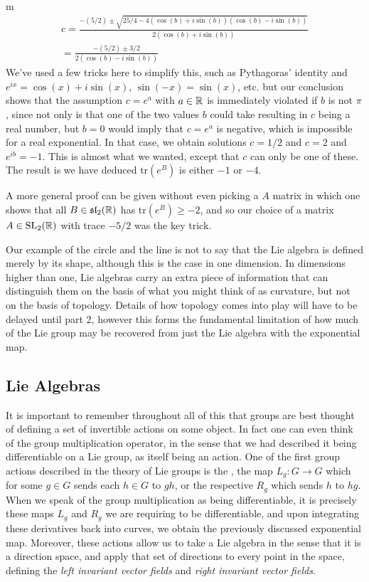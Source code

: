 \documentclass[11pt]{article}
\begin{document}
\begin{my proof}{m}
\begin{gather*}
c = \frac{-(5/2) \pm \sqrt{25/4 - 4(\cos(b) + i\sin(b))(\cos(b) - i\sin(b))}}{2(\cos(b) + i\sin(b))} \\
= \frac{-(5/2) \pm 3/2 }{2(\cos(b) - i\sin(b))}
\end{gather*}
We've used a few tricks here to simplify this, such as Pythagoras' identity and $e^{ix} = \cos(x) + i\sin(x)$, $\sin(-x) = \sin(x)$, etc. but our conclusion shows that the assumption $c = e^a$ with $a \in \mathbb{R}$ is immediately violated if $b$ is not $\pi$, since not only is that one of the two values $b$ could take resulting in $c$ being a real number, but $b=0$ would imply that $c= e^a$ is negative, which is impossible for a real exponential. In that case, we obtain solutions $c = 1/2$ and $c = 2$ and $e^{ib} = -1$. This is almost what we wanted, except that $c$ can only be one of these. The result is we have deduced $\mathrm{tr}(e^B)$ is either $-1$ or $-4$.

A more general proof can be given without even picking a $A$ matrix in which one shows that all $B \in \mathfrak{sl}_2(\mathbb{R})$ has $\mathrm{tr}(e^B) \ge -2$, and so our choice of a matrix $A \in \mathrm{SL}_2(\mathbb{R})$ with trace $-5/2$ was the key trick.
\end{my proof}

Our example of the circle and the line is not to say that the Lie algebra is defined merely by its shape, although this is the case in one dimension. In dimensions higher than one, Lie algebras carry an extra piece of information that can distinguish them on the basis of what you might think of as curvature, but not on the basis of topology. Details of how topology comes into play will have to be delayed until part 2, however this forms the fundamental limitation of how much of the Lie group may be recovered from just the Lie algebra with the exponential map.

\subsection{Lie Algebras}

It is important to remember throughout all of this that groups are best thought of defining a set of invertible actions on some object. In fact one can even think of the group multiplication operator, in the sense that we had described it being differentiable on a Lie group, as itself being an action. One of the first group actions described in the theory of Lie groups is the , the map $L_g \colon G \to G$ which for some $g \in G$ sends each $h\in G$ to $gh$, or the respective  $R_g$ which sends $h$ to $hg$. When we speak of the group multiplication as being differentiable, it is precisely these maps $L_g$ and $R_g$ we are requiring to be differentiable, and upon integrating these derivatives back into curves, we obtain the previously discussed exponential map. Moreover, these actions allow us to take a Lie algebra in the sense that it is a direction space, and apply that set of directions to every point in the space, defining the \emph{left invariant vector fields} and \emph{right invariant vector fields}. 
\end{document}
